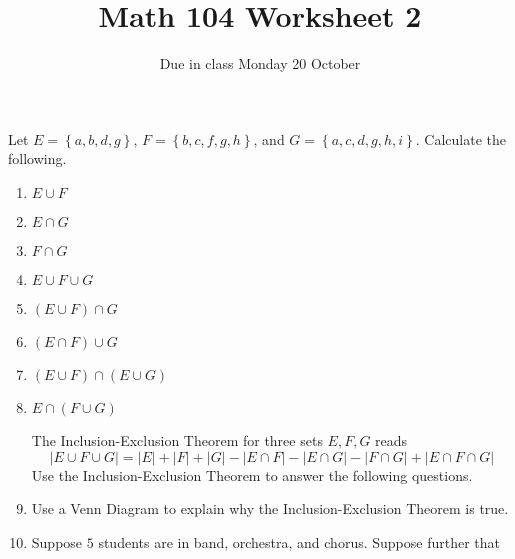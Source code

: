 \documentclass[11pt]{article}
\author{}\date{Due in class Monday 20 October}
\title{Math 104 Worksheet 2}\author{}
\begin{document}
\maketitle
\pagestyle{empty}
Let $E=\left\{a,b,d,g\right\}$,
$F=\left\{b,c,f,g,h\right\}$, and
$G=\left\{a,c,d,g,h,i\right\}$.
Calculate the following.
\begin{enumerate}
\item $E\cup F$\vspace{.25in}
\item $E\cap G$\vspace{.25in}
\item $F\cap G$\vspace{.25in}
\item $E\cup F\cup G$\vspace{.25in}
\item $\left(E\cup F\right)\cap G$\vspace{.25in}
\item $\left(E\cap F\right)\cup G$\vspace{.25in}
\item $\left(E\cup F\right)\cap\left(E\cup G\right)$\vspace{.25in}
\item $E\cap\left(F\cup G\right)$\vspace{.25in}

The Inclusion-Exclusion Theorem for three sets $E,F,G$ reads
\[\left|E\cup F\cup G\right|
=\left|E\right|+\left|F\right|+\left|G\right|
-\left|E\cap F\right|
-\left|E\cap G\right|
-\left|F\cap G\right|
+\left|E\cap F\cap G\right|\]
Use the Inclusion-Exclusion Theorem to answer the following questions.

\item Use a Venn Diagram to explain why
the Inclusion-Exclusion Theorem is true.
\item Suppose $5$ students are in band, orchestra, and chorus.
Suppose further that 
\end{enumerate}
\end{document}
